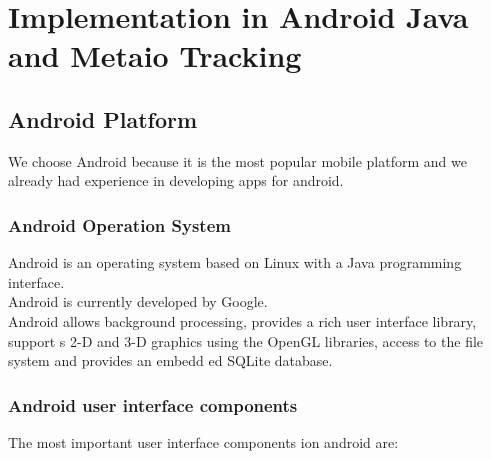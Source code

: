 
\chapter{Implementation in Android Java and Metaio Tracking} \label{chapter:metaio}
\section{Android Platform}
We choose Android because it is the most popular mobile platform and we already had experience in developing apps for android. 

\subsection{Android Operation System}
Android is an operating system based on Linux with a Java programming interface.
\\


Android is currently developed by Google.
\\


Android allows background processing, provides a rich user interface library, support
s 2-D and 3-D
graphics using the OpenGL libraries, access to the file system and provides an embedd
ed SQLite
database.\cite{androidDevTut}

\subsection{Android user interface components}
The most important user interface components ion android are: 

